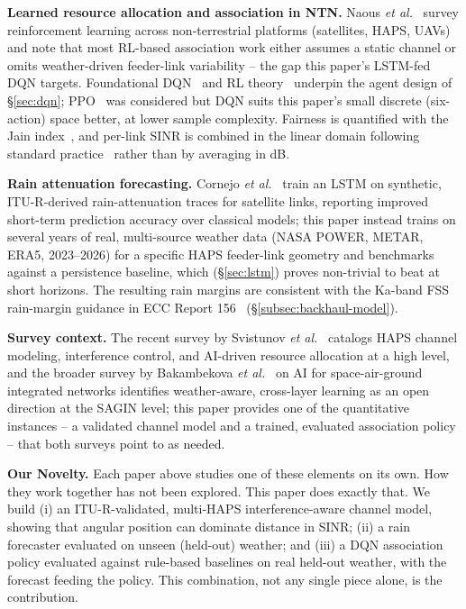\documentclass[]{ieeeaccess}
\begin{document}
\textbf{Learned resource allocation and association in NTN.} Naous \emph{et al.}~\cite{naous2023rlsky} survey reinforcement learning across non-terrestrial platforms (satellites, HAPS, UAVs) and note that most RL-based association work either assumes a static channel or omits weather-driven feeder-link variability -- the gap this paper's LSTM-fed DQN targets. Foundational DQN~\cite{mnih2015dqn} and RL theory~\cite{sutton2018rl} underpin the agent design of \S\ref{sec:dqn}; PPO~\cite{schulman2017ppo} was considered but DQN suits this paper's small discrete (six-action) space better, at lower sample complexity. Fairness is quantified with the Jain index~\cite{jain1984quantitative}, and per-link SINR is combined in the linear domain following standard practice~\cite{goldsmith2005} rather than by averaging in dB.

\textbf{Rain attenuation forecasting.} Cornejo \emph{et al.}~\cite{cornejo2022lstmrain} train an LSTM on synthetic, ITU-R-derived rain-attenuation traces for satellite links, reporting improved short-term prediction accuracy over classical models; this paper instead trains on several years of real, multi-source weather data (NASA POWER, METAR, ERA5, 2023--2026) for a specific HAPS feeder-link geometry and benchmarks against a persistence baseline, which (\S\ref{sec:lstm}) proves non-trivial to beat at short horizons. The resulting rain margins are consistent with the Ka-band FSS rain-margin guidance in ECC Report 156~\cite{ecc_report_156} (\S\ref{subsec:backhaul-model}).

\textbf{Survey context.} The recent survey by Svistunov \emph{et al.}~\cite{svistunov2025haps} catalogs HAPS channel modeling, interference control, and AI-driven resource allocation at a high level, and the broader survey by Bakambekova \emph{et al.}~\cite{bakambekova2024} on AI for space-air-ground integrated networks identifies weather-aware, cross-layer learning as an open direction at the SAGIN level; this paper provides one of the quantitative instances -- a validated channel model and a trained, evaluated association policy -- that both surveys point to as needed.

\textbf{Our Novelty.} Each paper above studies one of these elements on its own. How they work together has not been explored. This paper does exactly that. We build (i) an ITU-R-validated, multi-HAPS interference-aware channel model, showing that angular position can dominate distance in SINR; (ii) a rain forecaster evaluated on unseen (held-out) weather; and (iii) a DQN association policy evaluated against rule-based baselines on real held-out weather, with the forecast feeding the policy. This combination, not any single piece alone, is the contribution.
\end{document}
